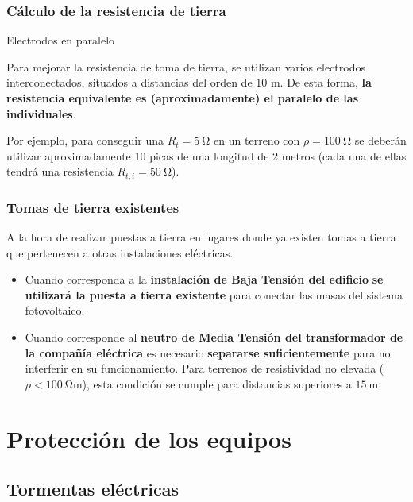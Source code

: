 \documentclass[serif, xcolor=dvipsnames]{beamer}
\begin{document}
\begin{frame}
\frametitle{Cálculo de la resistencia de tierra}
\begin{block}
{Electrodos en paralelo}

Para mejorar la resistencia de toma de tierra, se utilizan varios
electrodos interconectados, situados a distancias del orden de 10
m. De esta forma, \textbf{la resistencia equivalente es (aproximadamente)
el paralelo de las individuales}.

Por ejemplo, para conseguir una $R_{t}=\SI{5}{\ohm}$ en un terreno
con $\rho=\SI{100}{\ohm}$ se deberán utilizar aproximadamente 10
picas de una longitud de 2 metros (cada una de ellas tendrá una resistencia
$R_{t,i}=\SI{50}{\ohm}$).

\end{block}

\end{frame}

\begin{frame}
\frametitle{Tomas de tierra existentes}

A la hora de realizar puestas a tierra en lugares donde ya existen
tomas a tierra que pertenecen a otras instalaciones eléctricas.
\begin{itemize}
\item Cuando corresponda a la \textbf{instalación de Baja Tensión del edificio}
\textbf{se utilizará la puesta a tierra existente} para conectar las
masas del sistema fotovoltaico. 
\item Cuando corresponde al \textbf{neutro de Media Tensión del transformador
de la compañía eléctrica} es necesario \textbf{separarse suficientemente}
para no interferir en su funcionamiento. Para terrenos de resistividad
no elevada ($\rho<\SI{100}{\ohm\meter}$), esta condición se cumple
para distancias superiores a $\SI{15}{\meter}$.
\end{itemize}

\end{frame}

\section{Protección de los equipos}


\subsection{Tormentas eléctricas}
\end{document}
